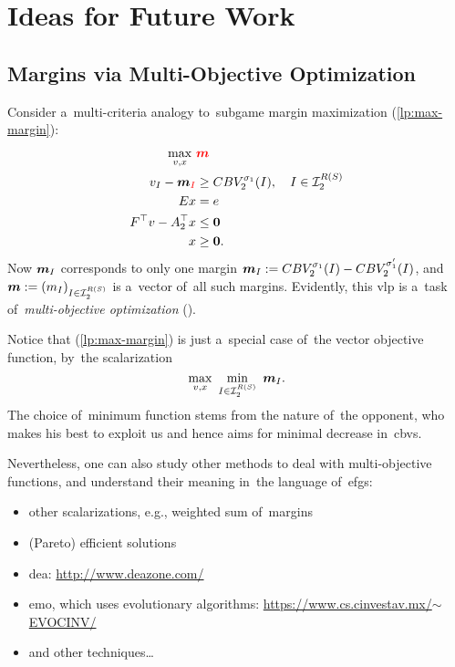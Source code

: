 \chapter{Ideas for Future Work}
\todo

\section{Margins via Multi-Objective Optimization}
Consider a~multi-criteria analogy to~subgame margin maximization (\ref{lp:max-margin}):
\begin{equation}
  \label{vlp:max-margins}
  \begin{split}
    \max_{v, x}\ &\textcolor{red}{\boldsymbol{m}} \\
    v_I - \boldsymbol{m}_{\textcolor{red}{I}} &\ge CBV_2^{\sigma_1}(I), \quad I \in \mathcal{I}_2^{R(S)}\\ 
    Ex &= e \\
    F^\top v - A_2^\top x &\le \boldsymbol{0} \\
    x &\ge \boldsymbol{0}.
  \end{split}
\end{equation}
Now $\boldsymbol{m}_I$ corresponds to only one margin $\boldsymbol{m}_I := CBV_2^{\sigma_1} (I) - CBV_2^{\sigma_1'} (I)$, and $\boldsymbol{m} := (m_I) _{I\in\mathcal{I}_2^{R(S)}}$ is a~vector of~all such margins.
Evidently, this \acrfull{vlp} is a~task of~\emph{multi-objective optimization} (\cite{Ehrgott2006multicriteria, Grygarova1996zaklady}).

Notice that (\ref{lp:max-margin}) is just a~special case of~the vector objective function, by~the scalarization
\[
  \max_{v, x}\ \min_{I \in \I_2^{R(S)}}\ {\vect{m}_I}.
\]
The choice of~minimum function stems from the nature of~the opponent, who makes his best to exploit us and hence aims for minimal decrease in~\acrshort{cbv}s.

Nevertheless, one can also study other methods to deal with multi-objective functions, and understand their meaning in~the language of~\acrshort{efg}s:
\begin{itemize}
  \item other scalarizations, e.g., weighted sum of~margins
  \item (Pareto) efficient solutions
  \item \acrfull{dea}:
    \href{http://www.deazone.com/}{http://www.deazone.com/}
  \item \acrfull{emo}, which uses evolutionary algorithms:
    \href{https://www.cs.cinvestav.mx/~EVOCINV/}{https://www.cs.cinvestav.mx/$\sim$EVOCINV/} %
  \item and other techniques\ldots
\end{itemize}
